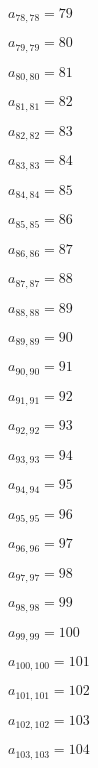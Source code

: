 \documentclass[a4paper,12pt]{article}
\begin{document}
$a _{ 78, 78 } = 79$

$a _{ 79, 79 } = 80$

$a _{ 80, 80 } = 81$

$a _{ 81, 81 } = 82$

$a _{ 82, 82 } = 83$

$a _{ 83, 83 } = 84$

$a _{ 84, 84 } = 85$

$a _{ 85, 85 } = 86$

$a _{ 86, 86 } = 87$

$a _{ 87, 87 } = 88$

$a _{ 88, 88 } = 89$

$a _{ 89, 89 } = 90$

$a _{ 90, 90 } = 91$

$a _{ 91, 91 } = 92$

$a _{ 92, 92 } = 93$

$a _{ 93, 93 } = 94$

$a _{ 94, 94 } = 95$

$a _{ 95, 95 } = 96$

$a _{ 96, 96 } = 97$

$a _{ 97, 97 } = 98$

$a _{ 98, 98 } = 99$

$a _{ 99, 99 } = 100$

$a _{ 100, 100 } = 101$

$a _{ 101, 101 } = 102$

$a _{ 102, 102 } = 103$

$a _{ 103, 103 } = 104$
\end{document}
